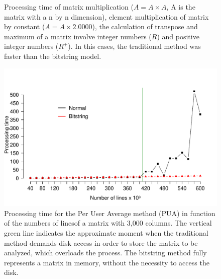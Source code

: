 \documentclass[10pt]{article}
\begin{document}
\begin{figure}[h]
{  }
  \caption{Processing time of matrix multiplication ($A = A \times A$, A is the matrix with a n by n dimension), 
  element multiplication of matrix by constant ($A=A \times 2.0000$), the calculation of transpose and maximum of a 
  matrix involve integer numbers ($R$) and positive integer numbers ($R^+$). In this cases, the traditional 
  method was faster than the bitstring model.}
  \label{fig:35363738}
\end{figure}

\begin{figure}[h]
  \centering
  \includegraphics[scale=0.6,clip]{fig39}
  \caption{Processing time for the Per User Average method (PUA) in function of the numbers of linesof a matrix 
  with 3,000 columns. The vertical green line indicates the approximate moment when the traditional method  
  demands  disk access in order to store the matrix to be analyzed, which  overloads the process. The bitstring 
  method fully represents a matrix  in memory, without the necessity to access the  disk.}
  \label{fig39}
\end{figure}
\end{document}
